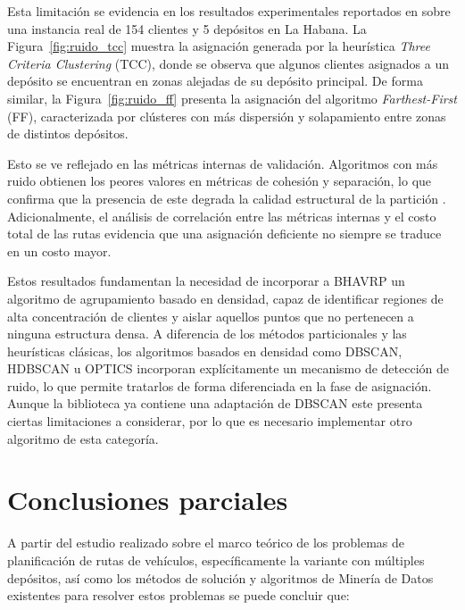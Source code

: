 Esta limitación se evidencia en los resultados experimentales reportados en \parencite{ericramosaragonIncorporacionModuloMetricas2025} sobre una instancia real de 154 clientes y 5 depósitos en La Habana. La Figura~\ref{fig:ruido_tcc} muestra la asignación generada por la heurística \textit{Three Criteria Clustering} (TCC), donde se observa que algunos clientes asignados a un depósito se encuentran en zonas alejadas de su depósito principal. De forma similar, la Figura~\ref{fig:ruido_ff} presenta la asignación del algoritmo \textit{Farthest-First} (FF), caracterizada por clústeres con más dispersión y solapamiento entre zonas de distintos depósitos.



Esto se ve reflejado en las métricas internas de validación. Algoritmos con más ruido obtienen los peores valores en métricas de cohesión y separación, lo que confirma que la presencia de este degrada la calidad estructural de la partición \parencite{ericramosaragonIncorporacionModuloMetricas2025}. Adicionalmente, el análisis de correlación entre las métricas internas y el costo total de las rutas evidencia que una asignación deficiente no siempre se traduce en un costo mayor.

Estos resultados fundamentan la necesidad de incorporar a BHAVRP un algoritmo de agrupamiento basado en densidad, capaz de identificar regiones de alta concentración de clientes y aislar aquellos puntos que no pertenecen a ninguna estructura densa. A diferencia de los métodos particionales y las heurísticas clásicas, los algoritmos basados en densidad como DBSCAN, HDBSCAN u OPTICS incorporan explícitamente un mecanismo de detección de ruido, lo que permite tratarlos de forma diferenciada en la fase de asignación. Aunque la biblioteca ya contiene una adaptación de DBSCAN este presenta ciertas limitaciones a considerar, por lo que es necesario implementar otro algoritmo de esta categoría.

\section{Conclusiones parciales}

A partir del estudio realizado sobre el marco teórico de los problemas de planificación de rutas de vehículos, específicamente la variante con múltiples depósitos, así como los métodos de solución y algoritmos de Minería de Datos existentes para resolver estos problemas se puede concluir que:

